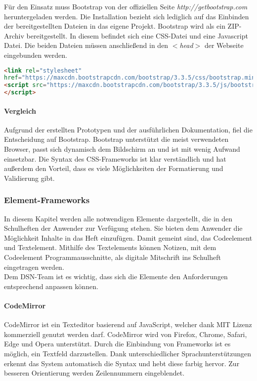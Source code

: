 Für den Einsatz muss Bootstrap von der offiziellen Seite \textit{http://getbootstrap.com} heruntergeladen werden. Die Installation bezieht sich lediglich auf das Einbinden der bereitgestellten Dateien in das eigene Projekt. Bootstrap wird als ein ZIP-Archiv bereitgestellt. In diesem befindet sich eine CSS-Datei und eine Javascript Datei. Die beiden Dateien müssen anschließend in den \textit{$<$head$>$} der Webseite eingebunden werden. \cite{BOOTSTRAP}
\begin{lstlisting}[caption={Bootstrap einbinden \cite{BOOTSTRAP}}, language=HTML]
<link rel="stylesheet"
href="https://maxcdn.bootstrapcdn.com/bootstrap/3.3.5/css/bootstrap.min.css">
<script src="https://maxcdn.bootstrapcdn.com/bootstrap/3.3.5/js/bootstrap.min.js">
</script>
\end{lstlisting}

\paragraph{Vergleich}
Aufgrund der erstellten Prototypen und der ausführlichen Dokumentation, fiel die Entscheidung auf Bootstrap. Bootstrap unterstützt die meist verwendeten Browser, passt sich dynamisch dem Bildschirm an und ist mit wenig Aufwand einsetzbar. Die Syntax des CSS-Frameworks ist klar verständlich und hat außerdem den Vorteil, dass es viele Möglichkeiten der Formatierung und Validierung gibt.

\subsubsection{Element-Frameworks}
In diesem Kapitel werden alle notwendigen Elemente dargestellt, die in den Schulheften der Anwender zur Verfügung stehen. Sie bieten dem Anwender die Möglichkeit Inhalte in das Heft einzufügen. Damit gemeint sind, das Codeelement und Textelement. Mithilfe des Textelements können Notizen, mit dem Codeelement Programmausschnitte, als digitale Mitschrift ins Schulheft eingetragen werden.\\
Dem DSN-Team ist es wichtig, dass sich die Elemente den Anforderungen entsprechend anpassen können.

\paragraph{CodeMirror}
CodeMirror ist ein Texteditor basierend auf JavaScript, welcher dank MIT Lizenz kommerziell genutzt werden darf. CodeMirror wird von Firefox, Chrome, Safari, Edge und Opera unterstützt. Durch die Einbindung von Frameworks ist es möglich, ein Textfeld darzustellen. Dank unterschiedlicher Sprachunterstützungen erkennt das System automatisch die Syntax und hebt diese farbig hervor. Zur besseren Orientierung werden Zeilennummern eingeblendet. \cite{CODEMIRROR}

